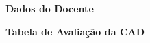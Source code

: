 \documentclass[11pt,a4paper]{article}
\begin{document}


\vspace{1cm}

\begin{center}
\large \textbf{Dados do Docente}\\
\end{center}



\begin{center}
\large \textbf{Tabela de Avaliação da CAD}\\
\end{center}
\noindent
\end{document}
